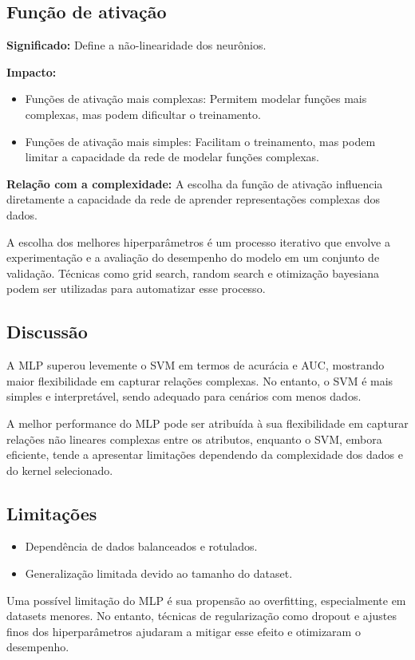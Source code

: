 \documentclass[12pt,a4paper,oneside,openany]{article}
\begin{document}
\subsection*{Função de ativação}
\textbf{Significado:} Define a não-linearidade dos neurônios.  

\noindent\textbf{Impacto:}
\begin{itemize}
    \item Funções de ativação mais complexas: Permitem modelar funções mais complexas, mas podem dificultar o treinamento.
    \item Funções de ativação mais simples: Facilitam o treinamento, mas podem limitar a capacidade da rede de modelar funções complexas.
\end{itemize}

\noindent\textbf{Relação com a complexidade:}  
A escolha da função de ativação influencia diretamente a capacidade da rede de aprender representações complexas dos dados.

\noindent
A escolha dos melhores hiperparâmetros é um processo iterativo que envolve a experimentação e a avaliação do desempenho do modelo em um conjunto de validação. Técnicas como grid search, random search e otimização bayesiana podem ser utilizadas para automatizar esse processo.

\subsection{Discussão}

A MLP superou levemente o SVM em termos de acurácia e AUC, mostrando maior flexibilidade em capturar relações complexas. No entanto, o SVM é mais simples e interpretável, sendo adequado para cenários com menos dados.

\noindent
A melhor performance do MLP pode ser atribuída à sua flexibilidade em capturar relações não lineares complexas entre os atributos, enquanto o SVM, embora eficiente, tende a apresentar limitações dependendo da complexidade dos dados e do kernel selecionado.

\subsection{Limitações}

\begin{itemize}
    \item Dependência de dados balanceados e rotulados.
    \item Generalização limitada devido ao tamanho do dataset.
\end{itemize}
\noindent
Uma possível limitação do MLP é sua propensão ao overfitting, especialmente em datasets menores. No entanto, técnicas de regularização como dropout e ajustes finos dos hiperparâmetros ajudaram a mitigar esse efeito e otimizaram o desempenho.
\end{document}
